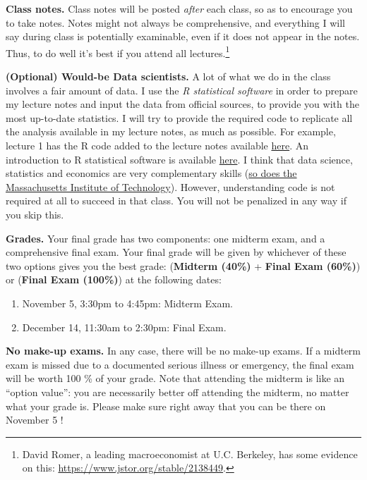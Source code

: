 \documentclass[]{book}
\providecommand{\tightlist}{%
  \setlength{\itemsep}{0pt}\setlength{\parskip}{0pt}}
\let\rmarkdownfootnote\footnote%
\def\footnote{\protect\rmarkdownfootnote}
\begin{document}
\textbf{Class notes.} Class notes will be posted \emph{after} each
class, so as to encourage you to take notes. Notes might not always be
comprehensive, and everything I will say during class is potentially
examinable, even if it does not appear in the notes. Thus, to do well
it's best if you attend all lectures.\footnote{David Romer, a leading
  macroeconomist at U.C. Berkeley, has some evidence on this:
  \url{https://www.jstor.org/stable/2138449}.}

\textbf{(Optional) Would-be Data scientists.} A lot of what we do in the
class involves a fair amount of data. I use the \emph{R statistical
software} in order to prepare my lecture notes and input the data from
official sources, to provide you with the most up-to-date statistics. I
will try to provide the required code to replicate all the analysis
available in my lecture notes, as much as possible. For example, lecture
1 has the R code added to the lecture notes available
\href{https://fgeerolf.github.io/teaching/ECON102/lecture1-R.pdf}{here}.
An introduction to R statistical software is available
\href{https://fgeerolf.github.io/teaching/ECON102/R-intro.pdf}{here}. I
think that data science, statistics and economics are very complementary
skills
(\href{https://www.eecs.mit.edu/academics-admissions/undergraduate-programs/6-14-computer-science-economics-and-data-science}{so
does the Massachusetts Institute of Technology}). However, understanding
code is not required at all to succeed in that class. You will not be
penalized in any way if you skip this.

\textbf{Grades.} Your final grade has two components: one midterm exam,
and a comprehensive final exam. Your final grade will be given by
whichever of these two options gives you the best grade:
(\textbf{Midterm (40\%)} + \textbf{Final Exam (60\%)}) or (\textbf{Final
Exam (100\%)}) at the following dates:

\begin{enumerate}
\def\labelenumi{\arabic{enumi}.}
\tightlist
\item
  November 5, 3:30pm to 4:45pm: Midterm Exam.
\item
  December 14, 11:30am to 2:30pm: Final Exam.
\end{enumerate}

\textbf{No make-up exams.} In any case, there will be no make-up exams.
If a midterm exam is missed due to a documented serious illness or
emergency, the final exam will be worth 100 \% of your grade. Note that
attending the midterm is like an ``option value'': you are necessarily
better off attending the midterm, no matter what your grade is. Please
make sure right away that you can be there on November 5 !
\end{document}
